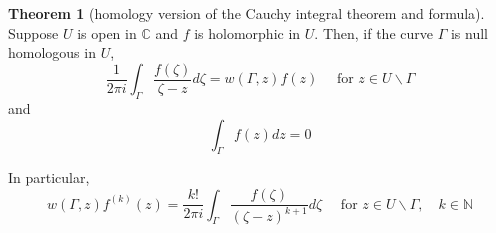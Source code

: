 \documentclass[12pt,a4paper]{book}
\theoremstyle{definition}
\newtheorem{theo}[defn]{Theorem}
\begin{document}
\begin{theo}[homology version of the Cauchy integral theorem and formula]
    Suppose $U$ is open in $\mathbb{C}$ and $f$ is holomorphic in $U$. Then, if the curve $\Gamma$ is null homologous in $U$,
    $$
    \frac{1}{2 \pi i} \int_{\Gamma} \frac{f(\zeta)}{\zeta-z} d \zeta=w(\Gamma, z) f(z) \quad \text { for } z \in U \backslash \Gamma
    $$
    and
    $$
    \int_{\Gamma} f(z) d z=0
    $$
    
In particular, 
$$
w(\Gamma, z) f^{(k)}(z)=\frac{k!}{2 \pi i} \int_{\Gamma} \frac{f(\zeta)}{(\zeta-z)^{k+1}} d \zeta \quad \text { for } z \in U \backslash \Gamma, \quad k \in \mathbb{N} 
$$
\end{theo}
\end{document}
